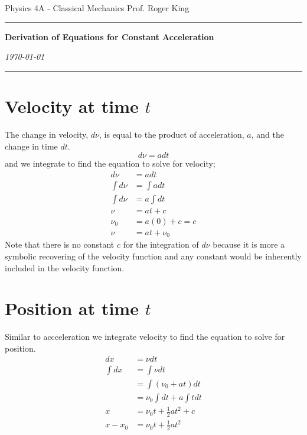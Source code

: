 \documentclass{article}
\begin{document}
\flushleft
Physics 4A - Classical Mechanics \hfill Prof. Roger King\\
\hrule

\begin{center}
    \vspace{14pt}
    \textbf{\LARGE Derivation of Equations for Constant Acceleration} \\
    \vspace{12pt}

    \textit{\today}
    \vspace{14pt}
\end{center}

\hrule

\section*{Velocity at time $t$}
The change in velocity, $d\nu$, is equal to the product of acceleration, $a$, and the change in time $dt$.
\[
	d\nu = a dt
\]
and we integrate to find the equation to solve for velocity;
\begin{align*}
	d\nu &= adt \\
	\int d\nu &= \int adt \\
	\int d\nu &= a \int dt \\
	\nu &= at + c \\
	\nu_0 &= a(0) + c = c \\
	\nu &= at + \nu_0
\end{align*}
Note that there is no constant $c$ for the integration of $d\nu$ because it is more a symbolic recovering of the velocity function and any constant would be inherently included in the velocity function.

\section*{Position at time $t$}
Similar to accceleration we integrate velocity to find the equation to solve for position.
\begin{align*}
	dx &= \nu dt \\
	\int dx &= \int \nu dt \\
	&= \int \left( \nu_0 + at \right) dt \\
	&= \nu_0 \int dt + a \int tdt \\
	x &= \nu_0t + \frac{1}{2} at^2 + c \\
	x-x_0 &= \nu_0t + \frac{1}{2} at^2 \\
\end{align*}
\end{document}
